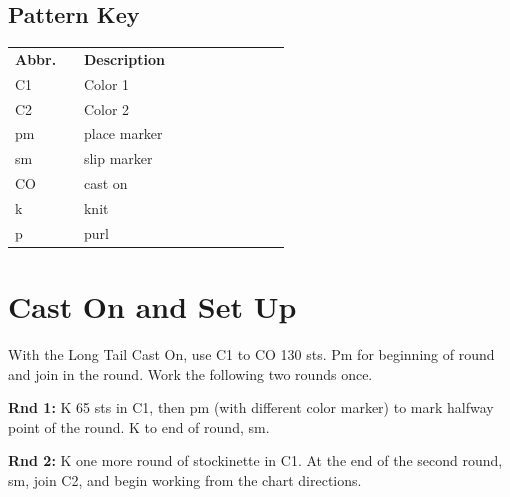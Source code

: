 \documentclass[12pt]{article}
\renewcommand{\arraystretch}{2}
\newcommand{\rowDir}[1]{\textbf{#1:}} %
\newenvironment{unframed}
    {%
	\begin{addmargin}[2em]{0pt}
	}
    {
	\setlength{\parindent}{0em}
	\end{addmargin}}
\begin{document}
\begin{multicols}{2}
\small

\subsection*{Pattern Key}

\renewcommand{\arraystretch}{1.3}
\begin{tabular}{| C{0.2\linewidth}  p{0.6\linewidth} | }
\thickhline {} 
\textbf{Abbr.}	& \textbf{Description} \\ \thickhline
C1	& Color 1 \\
C2	& Color 2 \\
pm	& place marker \\
sm	& slip marker \\
CO	& cast on \\
k	&  knit \\
p	& purl   \\
\hline
\end{tabular}

\vfill
\columnbreak

\section*{Cast On and Set Up}

With the Long Tail Cast On, use C1 to CO 130 sts. Pm for beginning of round and join in the round. Work the following two rounds once.
\\
\begin{unframed}
\rowDir{Rnd 1} K 65 sts in C1, then pm (with different color marker) to mark halfway point of the round. K to end of round, sm.

\rowDir{Rnd 2} K one more round of stockinette in C1. At the end of the second round, sm, join C2, and begin working from the chart directions.
\end{unframed}

\end{multicols}

\vspace{-1em}

\small
\end{document}
